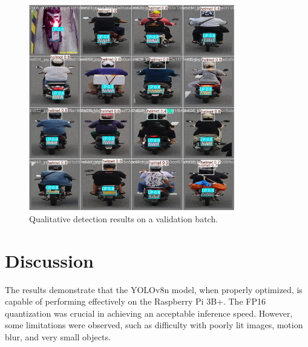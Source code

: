 \begin{figure}[H]
    \centering
    \includegraphics[width=0.8\textwidth]{../runs/detect/helmet_detection/val_batch0_pred.jpg}
    \caption{Qualitative detection results on a validation batch.}
    \label{fig:qualitative_results}
\end{figure}

\section{Discussion}
The results demonstrate that the YOLOv8n model, when properly optimized, is capable of performing effectively on the Raspberry Pi 3B+. The FP16 quantization was crucial in achieving an acceptable inference speed. However, some limitations were observed, such as difficulty with poorly lit images, motion blur, and very small objects.
